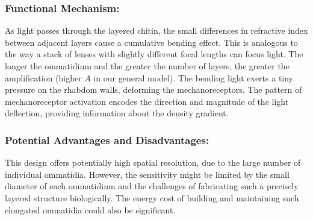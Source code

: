 \documentclass[11pt]{article}
\begin{document}
\subsubsection{Functional Mechanism:}
As light passes through the layered chitin, the small differences in refractive index between adjacent layers cause a cumulative bending effect. This is analogous to the way a stack of lenses with slightly different focal lengths can focus light. The longer the ommatidium and the greater the number of layers, the greater the amplification (higher $A$ in our general model). The bending light exerts a tiny pressure on the rhabdom walls, deforming the mechanoreceptors. The pattern of mechanoreceptor activation encodes the direction and magnitude of the light deflection, providing information about the density gradient.

\subsubsection{Potential Advantages and Disadvantages:}
This design offers potentially high spatial resolution, due to the large number of individual ommatidia. However, the sensitivity might be limited by the small diameter of each ommatidium and the challenges of fabricating such a precisely layered structure biologically. The energy cost of building and maintaining such elongated ommatidia could also be significant.
\end{document}
